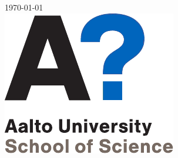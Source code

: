 \begin{titlepage}


{\large \today}\\[2cm] %


\includegraphics{AaltoSCI_EN_9.pdf}\\[1cm] %
 

\vfill %



\end{titlepage}



